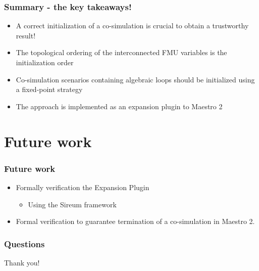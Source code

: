 \documentclass{beamer}
\begin{document}
\begin{frame}
\frametitle{Summary - the key takeaways!}
\begin{itemize}
    \item A correct initialization of a co-simulation is crucial to obtain a trustworthy result!
    \item The topological ordering of the interconnected FMU variables is the initialization order
    \item Co-simulation scenarios containing algebraic loops should be initialized using a fixed-point strategy
    \item The approach is implemented as an expansion plugin to Maestro 2  
\end{itemize}
\end{frame}

\section{Future work}

\begin{frame}
\frametitle{Future work}
\begin{itemize}
    \item Formally verification the Expansion Plugin  
    \begin{itemize}
        \item Using the Sireum framework
    \end{itemize}
    \item Formal verification to guarantee termination of a co-simulation in Maestro 2.
\end{itemize}
\end{frame}

\begin{frame}
\frametitle{Questions}
\huge
Thank you!
\end{frame}
\end{document}

